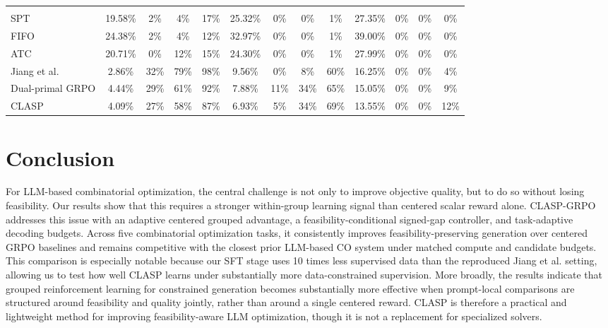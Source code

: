 \documentclass{article}
\theoremstyle{remark}
\begin{document}
\begin{table}[t]
{\begin{tabular}{lcccccccccccc}
\addlinespace[2pt]
\multicolumn{13}{l}{\textbf{JSSP}} \\
SPT & 19.58\% & 2\% & 4\% & 17\% & 25.32\% & 0\% & 0\% & 1\% & 27.35\% & 0\% & 0\% & 0\% \\
FIFO & 24.38\% & 2\% & 4\% & 12\% & 32.97\% & 0\% & 0\% & 1\% & 39.00\% & 0\% & 0\% & 0\% \\
ATC & 20.71\% & 0\% & 12\% & 15\% & 24.30\% & 0\% & 0\% & 1\% & 27.99\% & 0\% & 0\% & 0\% \\
Jiang et al. & 2.86\% & 32\% & 79\% & 98\% & 9.56\% & 0\% & 8\% & 60\% & 16.25\% & 0\% & 0\% & 4\% \\
Dual-primal GRPO & 4.44\% & 29\% & 61\% & 92\% & 7.88\% & 11\% & 34\% & 65\% & 15.05\% & 0\% & 0\% & 9\% \\
CLASP & 4.09\% & 27\% & 58\% & 87\% & 6.93\% & 5\% & 34\% & 69\% & 13.55\% & 0\% & 0\% & 12\% \\
\bottomrule
\end{tabular}%
}
\end{table}

\FloatBarrier


\section{Conclusion}
For LLM-based combinatorial optimization, the central challenge is not only to improve objective quality, but to do so without losing feasibility. Our results show that this requires a stronger within-group learning signal than centered scalar reward alone. CLASP-GRPO addresses this issue with an adaptive centered grouped advantage, a feasibility-conditional signed-gap controller, and task-adaptive decoding budgets. Across five combinatorial optimization tasks, it consistently improves feasibility-preserving generation over centered GRPO baselines and remains competitive with the closest prior LLM-based CO system under matched compute and candidate budgets. This comparison is especially notable because our SFT stage uses 10 times less supervised data than the reproduced Jiang et al. setting, allowing us to test how well CLASP learns under substantially more data-constrained supervision. More broadly, the results indicate that grouped reinforcement learning for constrained generation becomes substantially more effective when prompt-local comparisons are structured around feasibility and quality jointly, rather than around a single centered reward. CLASP is therefore a practical and lightweight method for improving feasibility-aware LLM optimization, though it is not a replacement for specialized solvers. 
\end{document}
